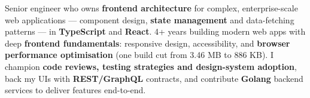 
\begin{cvparagraph}
Senior engineer who owns \textbf{frontend architecture} for complex, enterprise-scale web applications --- component design, \textbf{state management} and data-fetching patterns --- in \textbf{TypeScript} and \textbf{React}. 4+ years building modern web apps with deep \textbf{frontend fundamentals}: responsive design, accessibility, and \textbf{browser performance optimisation} (one build cut from 3.46 MB to 886 KB). I champion \textbf{code reviews, testing strategies and design-system adoption}, back my UIs with \textbf{REST/GraphQL} contracts, and contribute \textbf{Golang} backend services to deliver features end-to-end.
\end{cvparagraph}
